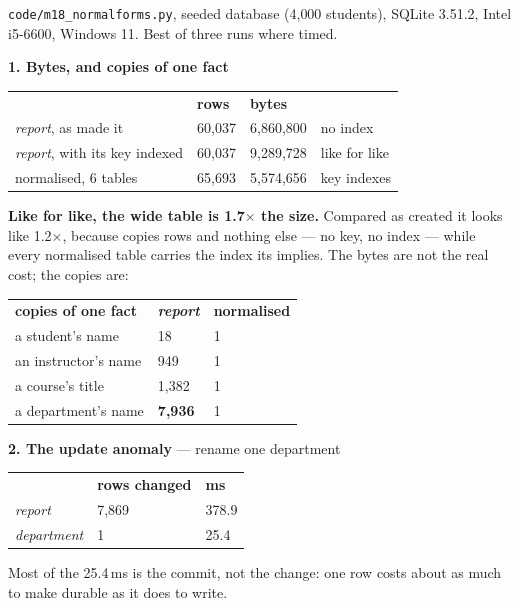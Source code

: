 \begin{measured}
\textsf{\footnotesize \texttt{code/m18\_normalforms.py}, seeded database
(4{,}000 students), SQLite 3.51.2, Intel i5-6600, Windows 11. Best of three
runs where timed.}

\medskip
\textbf{1. Bytes, and copies of one fact}

\begin{tabular}{@{}L{6.6cm}R{2.0cm}R{2.6cm}L{2.8cm}@{}}
& \textbf{rows} & \textbf{bytes} & \\
\textit{report}, as  made it & 60{,}037 & 6{,}860{,}800 & no index \\
\textit{report}, with its key indexed & 60{,}037 & 9{,}289{,}728 & like for like \\
normalised, 6 tables & 65{,}693 & 5{,}574{,}656 & key indexes \\
\end{tabular}

\smallskip
\textbf{Like for like, the wide table is 1.7$\times$ the size.} Compared as
created it looks like 1.2$\times$, because  copies rows
and nothing else --- no key, no index --- while every normalised table carries
the index its  implies. The bytes are not the real cost;
the copies are:

\begin{tabular}{@{}L{6.6cm}R{2.6cm}R{2.6cm}@{}}
\textbf{copies of one fact} & \textbf{\textit{report}} & \textbf{normalised} \\
a student's name & 18 & 1 \\
an instructor's name & 949 & 1 \\
a course's title & 1{,}382 & 1 \\
a department's name & \textbf{7{,}936} & 1 \\
\end{tabular}

\medskip
\textbf{2. The update anomaly} --- rename one department

\begin{tabular}{@{}L{6.6cm}R{2.6cm}R{2.6cm}@{}}
& \textbf{rows changed} & \textbf{ms} \\
\textit{report} & 7{,}869 & 378.9 \\
\textit{department} & 1 & 25.4 \\
\end{tabular}

\smallskip
Most of the 25.4\,ms is the commit, not the change: one row costs about as
much to make durable as it does to write.


\end{measured}
